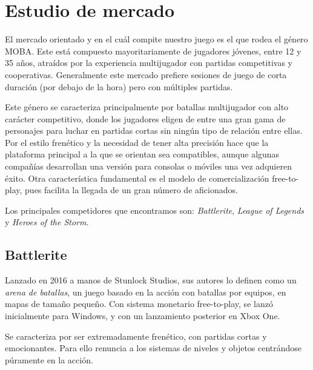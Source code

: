 \chapter{Estudio de mercado}

El mercado orientado y en el cuál compite nuestro juego es el que rodea el género MOBA. Este está compuesto mayoritariamente de jugadores jóvenes, entre 12 y 35 años, atraídos por la experiencia multijugador con partidas competitivas y cooperativas. Generalmente este mercado prefiere sesiones de juego de corta duración (por debajo de la hora) pero con múltiples partidas.

\vspace{\baselineskip}

Este género se caracteriza principalmente por batallas multijugador con alto carácter competitivo, donde los jugadores eligen de entre una gran gama de personajes para luchar en partidas cortas sin ningún tipo de relación entre ellas. Por el estilo frenético y la necesidad de tener alta precisión hace que la plataforma principal a la que se orientan sea compatibles, aunque algunas compañías desarrollan una versión para consolas o móviles una vez adquieren éxito. Otra característica fundamental es el modelo de comercialización free-to-play, pues facilita la llegada de un gran número de aficionados.

\vspace{\baselineskip}

Los principales competidores que encontramos son: \textit{Battlerite}, \textit{League of Legends} y \textit{Heroes of the Storm}.


\section{Battlerite}

Lanzado en 2016 a manos de Stunlock Studios, sus autores lo definen como un \textit{arena de batallas}, un juego basado en la acción con batallas por equipos, en mapas de tamaño pequeño.
Con sistema monetario free-to-play, se lanzó inicialmente para Windows, y con un lanzamiento posterior en Xbox One.

\vspace{\baselineskip}

Se caracteriza por ser extremadamente frenético, con partidas cortas y emocionantes. Para ello renuncia a los sistemas de niveles y objetos centrándose púramente en la acción.

